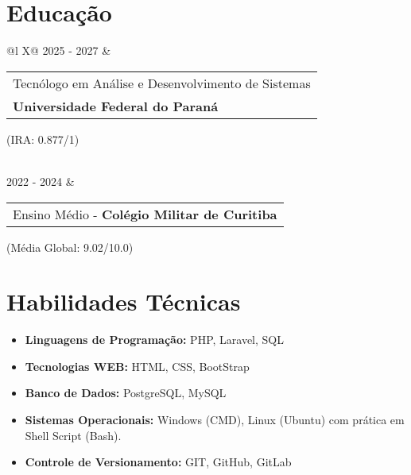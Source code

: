 \documentclass[a4paper,12pt]{article}
\begin{document}
\section{Educação}
\begin{tabularx}{\linewidth}{@{}l X@{}}
    2025 - 2027 & 
    \begin{tabular}[t]{@{}l@{}} 
        Tecnólogo em Análise e Desenvolvimento de Sistemas \\
        \textbf{Universidade Federal do Paraná}
    \end{tabular}
    \hfill \normalsize (IRA: 0.877/1) \\
     \\

    \addlinespace[8pt]

    2022 - 2024 & 
    \begin{tabular}[t]{@{}l@{}}
        Ensino Médio - \textbf{Colégio Militar de Curitiba}
    \end{tabular}
    \hfill (Média Global: 9.02/10.0) \\
\end{tabularx}



\section{Habilidades Técnicas}
\begin{itemize}[noitemsep, nolistsep, leftmargin=*]
  \item \textbf{Linguagens de Programação:} PHP, Laravel, SQL
  \item \textbf{Tecnologias WEB:} HTML, CSS, BootStrap
  \item \textbf{Banco de Dados:} PostgreSQL, MySQL
  \item \textbf{Sistemas Operacionais:} Windows (CMD), Linux (Ubuntu) com prática em Shell Script (Bash).
  \item \textbf{Controle de Versionamento:} GIT, GitHub, GitLab
\end{itemize}

\end{document}
